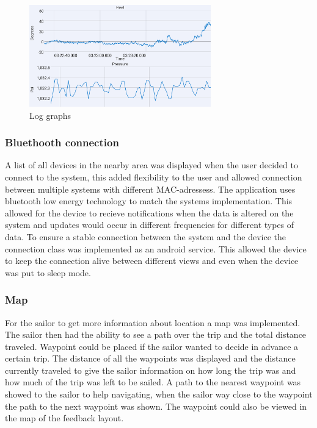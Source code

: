 \begin{figure}[H]
\centering
\includegraphics[width=0.7\textwidth]{Figures/log_graph.png}
\caption{Log graphs}
\label{log-graph}
\end{figure}

\subsubsection{Bluethooth connection}
A list of all devices in the nearby area was displayed when the user decided to connect to the system, this added flexibility to the user and allowed connection between multiple systems with different MAC-adressess. The application uses bluetooth low energy technology to match the systems implementation. This allowed for the device to recieve notifications when the data is altered on the system and updates would occur in different frequencies for different types of data. To ensure a stable connection between the system and the device the connection class was implemented as an android service\cite{android-service}. This allowed the device to keep the connection alive between different views and even when the device was put to sleep mode.

\subsubsection{Map}
For the sailor to get more information about location a map was implemented. The sailor then had the ability to see a path over the trip and the total distance traveled. Waypoint could be placed if the sailor wanted to decide in advance a certain trip. The distance of all the waypoints was displayed and the distance currently traveled to give the sailor information on how long the trip was and how much of the trip was left to be sailed. A path to the nearest waypoint was showed to the sailor to help navigating, when the sailor way close to the waypoint the path to the next waypoint was shown. The waypoint could also be viewed in the map of the feedback layout.

